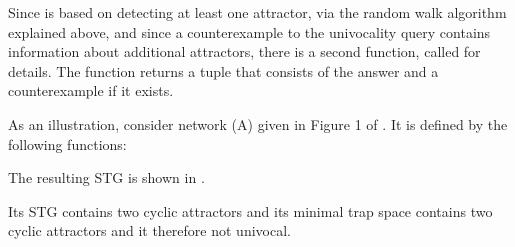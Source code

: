 \documentclass[letterpaper,10pt,english]{sphinxmanual}
\begin{document}
\begin{sphinxVerbatim}[commandchars=\\\{\}]
 
\end{sphinxVerbatim}

Since {\hyperref[\detokenize{Attractors:univocality}]{}} is based on detecting at least one attractor, via the random walk algorithm explained above,
and since a counterexample to the univocality query contains information about additional attractors,
there is a second function, called  for details.
The function {\hyperref[\detokenize{Attractors:faithfulness-with-counterexample}]{}} returns a tuple that consists of the answer and a counterexample if it exists.

As an illustration, consider network (A) given in Figure 1 of {\hyperref[\detokenize{Bibliography:klarner2015trap}]{}}.
It is defined by the following functions:

The resulting STG is shown in {\hyperref[\detokenize{Manual:figure28}]{}}.

Its STG contains two cyclic attractors and its minimal trap space \sphinxcode{-{-}-} contains two cyclic attractors and it therefore not univocal.
\end{document}
